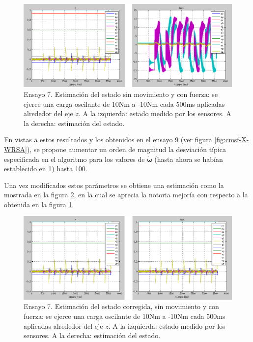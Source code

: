\begin{itemize}
\begin{figure}[h!]
\centering
\includegraphics[scale=0.4]{Figuras/smcf-X-Nz}
\caption[Ensayo 7. Estimación del estado sin movimiento y con fuerza]{Ensayo 7. Estimación del estado sin movimiento y con fuerza: se ejerce una carga oscilante de 10Nm a -10Nm cada 500ms aplicadas alrededor del eje $z$. A la izquierda: estado medido por los sensores. A la derecha: estimación del estado.}
\label{fig:smcf-X-Nz}
\end{figure}

En vistas a estos resultados y los obtenidos en el ensayo 9 (ver figura \ref{fig:cmsf-X-WRSA}), se propone aumentar un orden de magnitud la desviación típica especificada en el algoritmo para los valores de $\boldsymbol{\dot{\omega}}$ (hasta ahora se habían establecido en 1) hasta 100. \par 

Una vez modificados estos parámetros se obtiene una estimación como la mostrada en la figura \ref{fig:smcf-X-Nz2}, en la cual se aprecia la notoria mejoría con respecto a la obtenida en la figura \ref{fig:smcf-X-Nz}. \par 

\begin{figure}[h!]
\centering
\includegraphics[scale=0.4]{Figuras/smcf-X-Nz2}
\caption[Ensayo 7. Estimación del estado corregida, sin movimiento y con fuerza]{Ensayo 7. Estimación del estado corregida, sin movimiento y con fuerza: se ejerce una carga oscilante de 10Nm a -10Nm cada 500ms aplicadas alrededor del eje $z$. A la izquierda: estado medido por los sensores. A la derecha: estimación del estado.}
\label{fig:smcf-X-Nz2}
\end{figure}

\end{itemize}

